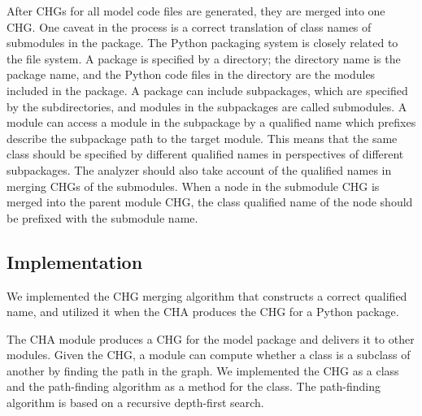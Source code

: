 After CHGs for all model code files are generated, 
they are merged into one CHG.
One caveat in the process is a correct translation of class names
of submodules in the package.
The Python packaging system is closely related to the file system.
A package is specified by a directory; 
the directory name is the package name, 
and the Python code files in the directory are the modules included in the package.
A package can include subpackages, which are specified
by the subdirectories, and modules in the subpackages are called submodules.
A module can access a module in the subpackage by a qualified name
which prefixes describe the subpackage path to the target module.
This means that the same class should be specified by different qualified
names in perspectives of different subpackages.
The analyzer should also take account of the qualified names
in merging CHGs of the submodules. 
When a node in the submodule CHG is merged into the parent module CHG,
the class qualified name of the node should be prefixed with the
submodule name.

\subsection{Implementation}
We implemented the CHG merging algorithm that constructs a correct
qualified name, and utilized it when the CHA produces the CHG for
a Python package. 

The CHA module produces a CHG for the model package and delivers it to
other modules. Given the CHG, a module can compute whether a class is
a subclass of another by finding the path in the graph.
We implemented the CHG as a class and the path-finding algorithm as
a method for the class. The path-finding algorithm is based on
a recursive depth-first search.


